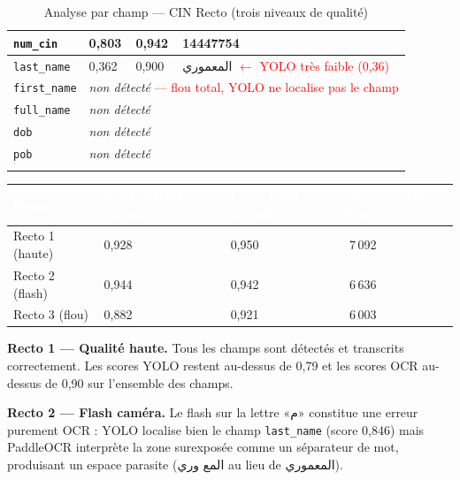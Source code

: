 \begin{longtable}{|p{3cm}|p{1.8cm}|p{1.8cm}|p{7.5cm}|}
  \texttt{num\_cin}    & 0,803 & 0,942 & 14447754 \\ \hline
  \texttt{last\_name}  & 0,362 & 0,900 & \textarabic{المعموري} \textcolor{red}{\small$\leftarrow$ YOLO très faible (0,36)} \\ \hline
  \texttt{first\_name} & \multicolumn{3}{p{11.1cm}|}{\textit{non détecté} \textcolor{red}{\small--- flou total, YOLO ne localise pas le champ}} \\ \hline
  \texttt{full\_name}  & \multicolumn{3}{p{11.1cm}|}{\textit{non détecté}} \\ \hline
  \texttt{dob}         & \multicolumn{3}{p{11.1cm}|}{\textit{non détecté}} \\ \hline
  \texttt{pob}         & \multicolumn{3}{p{11.1cm}|}{\textit{non détecté}} \\ \hline
  \caption{Analyse par champ --- CIN Recto (trois niveaux de qualité)}
  \label{tab:analyse-recto}
\end{longtable}

\renewcommand{\arraystretch}{1.25}
\begin{center}
  \begin{tabular}{|p{4cm}|p{3.5cm}|p{3.5cm}|p{3cm}|}
    \hline
    \rowcolor{bleu_principal}
    \textcolor{white}{\textbf{Image}} & \textcolor{white}{\textbf{Conf. YOLO globale}} & \textcolor{white}{\textbf{Conf. OCR globale}} & \textcolor{white}{\textbf{Temps total (ms)}} \\
    \hline
    Recto 1 (haute)   & 0,928 & 0,950 & 7\,092 \\ \hline
    Recto 2 (flash)   & 0,944 & 0,942 & 6\,636 \\ \hline
    Recto 3 (flou)    & 0,882 & 0,921 & 6\,003 \\ \hline
  \end{tabular}
  \label{tab:recap-recto}
\end{center}

\textbf{Recto 1 --- Qualité haute.} Tous les champs sont détectés et transcrits correctement. Les scores YOLO restent au-dessus de 0,79 et les scores OCR au-dessus de 0,90 sur l'ensemble des champs.

\textbf{Recto 2 --- Flash caméra.} Le flash sur la lettre «\textarabic{م}» constitue une erreur purement OCR : YOLO localise bien le champ \texttt{last\_name} (score 0,846) mais PaddleOCR interprète la zone surexposée comme un séparateur de mot, produisant un espace parasite (\textarabic{المع وري} au lieu de \textarabic{المعموري}).

